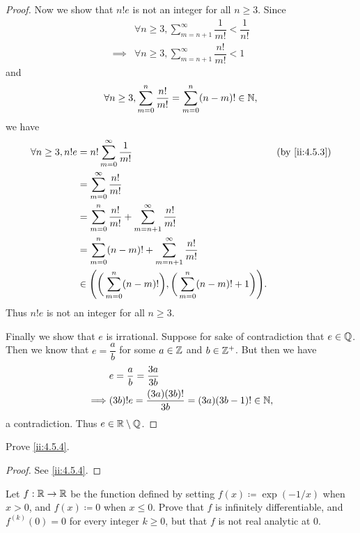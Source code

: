 \begin{proof}
  Now we show that \(n! e\) is not an integer for all \(n \geq 3\).
  Since
  \begin{align*}
             & \forall n \geq 3, \sum_{m = n + 1}^\infty \dfrac{1}{m!} < \dfrac{1}{n!} \\
    \implies & \forall n \geq 3, \sum_{m = n + 1}^\infty \dfrac{n!}{m!} < 1
  \end{align*}
  and
  \[
    \forall n \geq 3, \sum_{m = 0}^n \dfrac{n!}{m!} = \sum_{m = 0}^n (n - m)! \in \mathbb{N},
  \]
  we have
  \begin{align*}
    \forall n \geq 3, n! e & = n! \sum_{m = 0}^\infty \dfrac{1}{m!}                                                        &  & \by{ii:4.5.3} \\
                           & = \sum_{m = 0}^\infty \dfrac{n!}{m!}                                                                             \\
                           & = \sum_{m = 0}^n \dfrac{n!}{m!} + \sum_{m = n + 1}^\infty \dfrac{n!}{m!}                                         \\
                           & = \sum_{m = 0}^n (n - m)! + \sum_{m = n + 1}^\infty \dfrac{n!}{m!}                                               \\
                           & \in \Bigg(\bigg(\sum_{m = 0}^n (n - m)!\bigg), \bigg(\sum_{m = 0}^n (n - m)! + 1\bigg)\Bigg).
  \end{align*}
  Thus \(n! e\) is not an integer for all \(n \geq 3\).

  Finally we show that \(e\) is irrational.
  Suppose for sake of contradiction that \(e \in \mathbb{Q}\).
  Then we know that \(e = \dfrac{a}{b}\) for some \(a \in \mathbb{Z}\) and \(b \in \mathbb{Z}^+\).
  But then we have
  \begin{align*}
             & e = \dfrac{a}{b} = \dfrac{3a}{3b}                         \\
    \implies & (3b)! e = \dfrac{(3a) (3b)!}{3b} = (3a) (3b - 1)! \in \mathbb{N},
  \end{align*}
  a contradiction.
  Thus \(e \in \mathbb{R} \setminus \mathbb{Q}\).
\end{proof}

\begin{ex}\label{ii:ex:4.5.3}
  Prove \cref{ii:4.5.4}.
\end{ex}

\begin{proof}
  See \cref{ii:4.5.4}.
\end{proof}

\begin{ex}\label{ii:ex:4.5.4}
  Let \(f : \mathbb{R} \to \mathbb{R}\) be the function defined by setting \(f(x) \coloneqq \exp(-1 / x)\) when \(x > 0\), and \(f(x) \coloneqq 0\) when \(x \leq 0\).
  Prove that \(f\) is infinitely differentiable, and \(f^{(k)}(0) = 0\) for every integer \(k \geq 0\), but that \(f\) is not real analytic at \(0\).
\end{ex}

